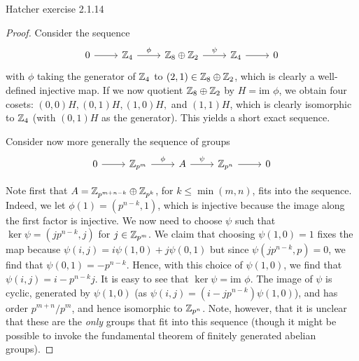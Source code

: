 \documentclass{../../mathnotes}
\begin{document}
\begin{prop}
    Hatcher exercise 2.1.14
\end{prop}
\begin{proof}
    Consider the sequence
    \begin{equation*}
        \begin{tikzcd}
            0\ar{r} & \Z_4 \ar{r}{\phi} & \Z_8\oplus\Z_2\ar{r}{\psi} & \Z_4\ar{r} & 0
        \end{tikzcd}
    \end{equation*}
    with $\phi$ taking the generator of $\mathbb{Z}_4$ to $(2,1)\in\mathbb{Z}_8\oplus\mathbb{Z}_2$, which is clearly a well-defined
    injective map. If we now quotient $\mathbb{Z}_8\oplus\mathbb{Z}_2$ by $H=\text{im }\phi$, we obtain four cosets: $(0,0)H, (0,1)H, (1,0)H,$
    and $(1,1)H$, which is clearly isomorphic to $\mathbb{Z}_4$ (with $(0,1)H$ as the generator). This yields
    a short exact sequence.

    Consider now more generally the sequence of groups
    \begin{equation*}
        \begin{tikzcd}
            0\ar{r} & \Z_{p^m}\ar{r}{\phi} & A\ar{r}{\psi} & \Z_{p^n}\ar{r} & 0
        \end{tikzcd}
    \end{equation*}

    Note first that $A = \mathbb{Z}_{p^{m+n-k}} \oplus \mathbb{Z}_{p^{k}}$, for $k \leq \min(m,n)$, fits into the sequence. 
    Indeed, we let $\phi(1)=(p^{n-k},1)$, which is injective because the image along the first factor is injective.
    We now need to choose $\psi$ such that $\ker\psi=(jp^{n-k},j)$ for $j\in\mathbb{Z}_{p^m}$. We claim that choosing
    $\psi(1,0)=1$ fixes the map because $\psi(i,j)=i\psi(1,0)+j\psi(0,1)$ but since $\psi(jp^{n-k},p)=0$,
    we find that $\psi(0,1)=-p^{n-k}$. Hence, with this choice of $\psi(1,0)$, we find that
    $\psi(i,j)=i-p^{n-k}j.$ It is easy to see that $\ker\psi=\text{im }\phi$. The image of $\psi$
    is cyclic, generated by $\psi(1,0)$ (as $\psi(i,j)=(i-jp^{n-k})\psi(1,0)$), and has order $p^{m+n}/p^m$, 
    and hence isomorphic to $\mathbb{Z}_{p^n}$.
    Note, however, that it is unclear that these are the \textit{only} groups that fit into this sequence
    (though it might be possible to invoke the fundamental theorem of finitely generated abelian groups).


\end{proof}
\end{document}
